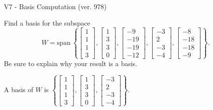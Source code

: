 \begin{exercise}
  \begin{exerciseTitle}V7 - Basis Computation (ver. 978)\end{exerciseTitle}
  \begin{exerciseStatement}
    Find a basis for the subspace 
\[W=\mathrm{span}\ \left\{\left[\begin{array}{r}
1 \\
1 \\
1 \\
3
\end{array}\right] , \left[\begin{array}{r}
1 \\
3 \\
3 \\
0
\end{array}\right] , \left[\begin{array}{r}
-9 \\
-19 \\
-19 \\
-12
\end{array}\right] , \left[\begin{array}{r}
-3 \\
2 \\
-3 \\
-4
\end{array}\right] , \left[\begin{array}{r}
-8 \\
-18 \\
-18 \\
-9
\end{array}\right]\right\}.\]
 Be sure to explain why your result is a basis.


  \end{exerciseStatement}
  \begin{exerciseAnswer}
   A basis of \(W\) is  \(\left\{\left[\begin{array}{r}
1 \\
1 \\
1 \\
3
\end{array}\right] , \left[\begin{array}{r}
1 \\
3 \\
3 \\
0
\end{array}\right] , \left[\begin{array}{r}
-3 \\
2 \\
-3 \\
-4
\end{array}\right]\right\}\).
  


  \end{exerciseAnswer}
\end{exercise}